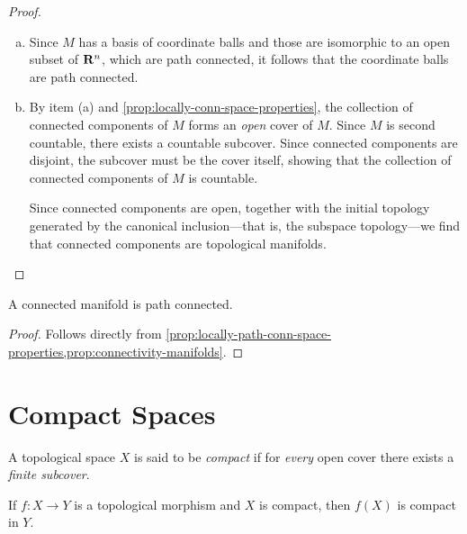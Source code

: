 \begin{proof}
\begin{enumerate}[(a)]\setlength\itemsep{0em}
\item Since \(M\) has a basis of coordinate balls and those are isomorphic to an
  open subset of \(\mathbf{R}^n\), which are path connected, it follows that the
  coordinate balls are path connected.

\item By item (a) and \cref{prop:locally-conn-space-properties}, the collection
  of connected components of \(M\) forms an \emph{open} cover of \(M\). Since
  \(M\) is second countable, there exists a countable subcover. Since connected
  components are disjoint, the subcover must be the cover itself, showing that
  the collection of connected components of \(M\) is countable.

  Since connected components are open, together with the initial topology
  generated by the canonical inclusion---that is, the subspace topology---we
  find that connected components are topological manifolds.
\end{enumerate}
\end{proof}

\begin{corollary}
\label{cor:manifold-connected-iff-path-connected}
A connected manifold is path connected.
\end{corollary}

\begin{proof}
Follows directly from
\cref{prop:locally-path-conn-space-properties,prop:connectivity-manifolds}.
\end{proof}

\section{Compact Spaces}

\begin{definition}
\label{def:compact-space}
A topological space \(X\) is said to be \emph{compact} if for \emph{every} open
cover there exists a \emph{finite subcover}.
\end{definition}

\begin{proposition}
\label{prop:image-of-compact-is-compact}
If \(f: X \to Y\) is a topological morphism and \(X\) is compact, then \(f(X)\)
is compact in \(Y\).
\end{proposition}

